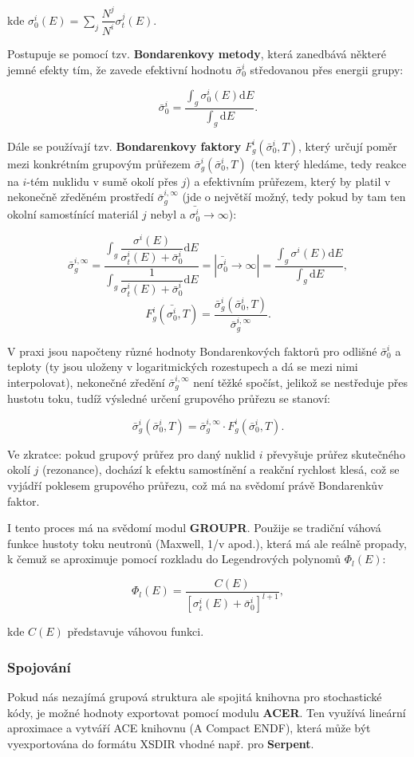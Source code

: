 \noindent kde $\sigma_0^i(E) = \sum_j \dfrac{N^j}{N^i} \sigma_t^j(E).$

Postupuje se pomocí tzv. \textbf{Bondarenkovy metody}, která zanedbává některé jemné efekty tím, že zavede efektivní hodnotu $\bar{\sigma}_0^i$ středovanou přes energii grupy:

$$ \bar{\sigma}_0^i = \dfrac{\int_g \sigma^i_0(E) \text{d}E}{\int_g \text{d}E}.$$

Dále se používají tzv. \textbf{Bondarenkovy faktory} $F_g^i(\bar{\sigma}_0^i, T)$, který určují poměr mezi konkrétním grupovým průřezem $\bar{\sigma}_g^i(\bar{\sigma}_0^i, T)$ (ten který hledáme, tedy reakce na $i$-tém nuklidu v sumě okolí přes $j$) a efektivním průřezem, který by platil v nekonečně zředěném prostředí $\bar{\sigma}_g^{i,\infty}$ (jde o největší možný, tedy pokud by tam ten okolní samostínící materiál $j$ nebyl a $\bar{\sigma_0^i} \rightarrow \infty$):

$$ \bar{\sigma}_g^{i,\infty} = \dfrac{\int_g \dfrac{\sigma^i(E)}{\sigma_t^i(E) + \bar{\sigma}_0^i} \text{d}E}{\int_g \dfrac{1}{\sigma_t^i(E) + \bar{\sigma}_0^i} \text{d}E} = |\bar{\sigma_0^i} \rightarrow \infty| = \dfrac{\int_g \sigma^i(E) \text{d}E}{\int_g \text{d}E},$$
$$ F_g^i (\bar{\sigma_0^i}, T) = \dfrac{\bar{\sigma}_g^i(\bar{\sigma}_0^i, T)}{\bar{\sigma}_g^{i,\infty}}. $$

V praxi jsou napočteny různé hodnoty Bondarenkových faktorů pro odlišné $\bar{\sigma}_0^i$ a teploty (ty jsou uloženy v logaritmických rozestupech a dá se mezi nimi interpolovat), nekonečné zředění $\bar{\sigma}_g^{i,\infty}$ není těžké spočíst, jelikož se nestředuje přes hustotu toku, tudíž výsledné určení grupového průřezu se stanoví:

\begin{equation}
  \boxed{
    \bar{\sigma}_g^i(\bar{\sigma}_0^i, T) = \bar{\sigma}_g^{i,\infty} \cdot F_g^i (\bar{\sigma}_0^i, T).}
\end{equation}

Ve zkratce: pokud grupový průřez pro daný nuklid  $i$ převyšuje průřez skutečného okolí $j$ (rezonance), dochází k efektu samostínění a reakční rychlost klesá, což se vyjádří poklesem grupového průřezu, což má na svědomí právě Bondarenkův faktor.

I tento proces má na svědomí modul \textbf{GROUPR}. Použije se tradiční váhová funkce hustoty toku neutronů (Maxwell, 1/v apod.), která má ale reálně propady, k čemuž se aproximuje pomocí rozkladu do Legendrových polynomů $\Phi_l(E)$:

$$\Phi_l(E) = \dfrac{C(E)}{\left [ \sigma_t^i(E) + \bar{\sigma}_0^i \right ]^{l+1}},$$

\noindent kde $C(E)$ představuje váhovou funkci.

\subsubsection{Spojování}

Pokud nás nezajímá grupová struktura ale spojitá knihovna pro stochastické kódy, je možné hodnoty exportovat pomocí modulu \textbf{ACER}. Ten využívá lineární aproximace a vytváří ACE knihovnu (A Compact ENDF), která může být vyexportována do formátu XSDIR vhodné např. pro \textbf{Serpent}.